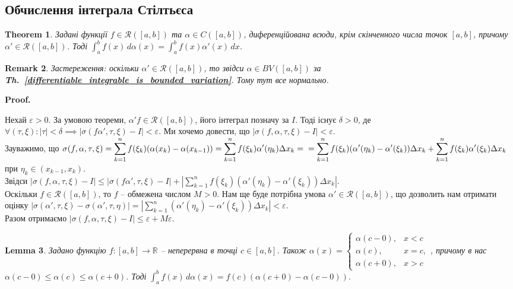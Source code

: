 \documentclass[a4paper, 10pt]{article}
\makeatletter
\theoremstyle{theoremdd}
\newtheorem{theorem}{Theorem}[subsection]
\theoremstyle{theoremdd}
\theoremstyle{theoremdd}
\theoremstyle{theoremdd}
\theoremstyle{theoremdd}
\theoremstyle{theoremdd}
\theoremstyle{theoremdd}
\newtheorem{remark}[theorem]{Remark}
\theoremstyle{theoremdd}
\newtheorem{lemma}[theorem]{Lemma}
\theoremstyle{theoremdd}
\newcommand\thref[1]{\textbf{Th.~\ref{#1}}}
\renewenvironment{proof}[1][Proof.\\]{\par
\pushQED{\hfill \qed}%
\normalfont \topsep6\p@\@plus6\p@\relax
\trivlist
\item\relax
{\bfseries
#1\@addpunct{.}}\hspace\labelsep\ignorespaces
}{%
\popQED\endtrivlist\@endpefalse
}
\makeatother
\begin{document}
\subsection{Обчислення інтеграла Стілтьєса}
\begin{theorem}
Задані функції $f \in \mathcal{R}([a,b])$ та $\alpha \in C([a,b])$, диференційована всюди, крім скінченного числа точок $[a,b]$, причому $\alpha' \in \mathcal{R}([a,b])$. Тоді $\displaystyle\int_a^b f(x)\,d\alpha(x) = \int_a^b f(x)\alpha'(x)\,dx$.
\end{theorem}

\begin{remark}
Застереження: оскільки $\alpha' \in \mathcal{R}([a,b])$, то звідси $\alpha \in BV([a,b])$ за \thref{differentiable_integrable_is_bounded_variation}. Тому тут все нормально.
\end{remark}

\begin{proof}
Нехай $\varepsilon > 0$. За умовою теореми, $\alpha' f \in \mathcal{R}([a,b])$, його інтеграл позначу за $I$. Тоді існує $\delta > 0$, де $\forall (\tau,\xi): |\tau| < \delta \implies |\sigma(f \alpha', \tau, \xi) - I| < \varepsilon$. Ми хочемо довести, що $|\sigma(f,\alpha,\tau,\xi) - I| < \varepsilon$.\\
Зауважимо, що $\sigma(f,\alpha,\tau,\xi) = \displaystyle\sum_{k=1}^n f(\xi_k) (\alpha(x_{k}) - \alpha(x_{k-1})) = \sum_{k=1}^n f(\xi_k) \alpha'(\eta_k) \Delta x_k = \\ =  \sum_{k=1}^n f(\xi_k) (\alpha'(\eta_k) - \alpha'(\xi_k)) \Delta x_k + \sum_{k=1}^n f(\xi_k) \alpha'(\xi_k) \Delta x_k$ при $\eta_k \in (x_{k-1},x_k)$.\\
Звідси $|\sigma(f,\alpha,\tau,\xi) - I| \leq |\sigma (f\alpha', \tau,\xi) - I| + \displaystyle\left|\sum_{k=1}^n f(\xi_k) (\alpha'(\eta_k) - \alpha'(\xi_k)) \Delta x_k\right|$.\\
Оскільки $f \in \mathcal{R}([a,b])$, то $f$ -- обмежена числом $M > 0$. Нам ще буде потрібна умова $\alpha' \in \mathcal{R}([a,b])$, що дозволить нам отримати оцінку $|\sigma(\alpha',\tau,\xi) - \sigma(\alpha',\tau,\eta)| = \displaystyle\left| \sum_{k=1}^n (\alpha'(\eta_k) - \alpha'(\xi_k)) \Delta x_k \right| < \varepsilon$.\\
Разом отримаємо $|\sigma(f,\alpha,\tau,\xi) - I| \leq \varepsilon + M \varepsilon$.
\end{proof}

\begin{lemma}
Задано функцію $f \colon [a,b] \to \mathbb{R}$ -- неперервна в точці $c \in [a,b]$. Також $\alpha(x) = \begin{cases} \alpha(c-0), & x < c \\ \alpha(c), & x = c, \\ \alpha(c+0), & x > c \end{cases}$, причому в нас $\alpha(c-0) \leq \alpha(c) \leq \alpha(c+0)$. Тоді $\displaystyle\int_a^b f(x)\,d\alpha(x) = f(c)(\alpha(c+0) - \alpha(c-0))$.
\end{lemma}
\end{document}
